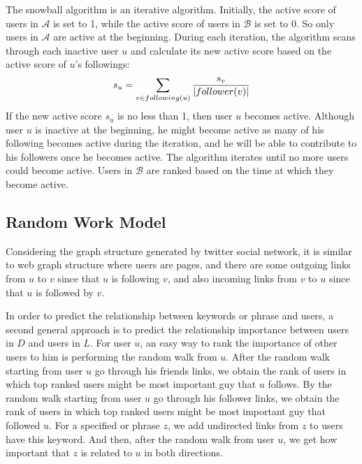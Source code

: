 \documentclass{article}
\begin{document}
The snowball algorithm is an iterative algorithm. Initially, the active score of users in $\mathcal{A}$ is set to 1, while the active score of users in $\mathcal{B}$ is set to 0. So only users in $\mathcal{A}$ are active at the beginning. During each iteration, the algorithm scans through each inactive user $u$ and calculate its new active score based on the active score of $u$'s followings:
\begin{equation}\label{eq:snowball}
s_u = \sum_{v \in following(u)} \frac{s_v}{|follower(v)|}
\end{equation}
If the new active score $s_u$ is no less than 1, then user $u$ becomes active. Although user $u$ is inactive at the beginning, he might become active as many of his following becomes active during the iteration, and he will be able to contribute to his followers once he becomes active. The algorithm iterates until no more users could become active. Users in $\mathcal{B}$ are ranked based on the time at which they become active.

\subsection{Random Work Model}
Considering the graph structure generated by twitter social network, it is similar to web graph structure where users are pages, and there are some outgoing links from $u$ to $v$ since that $u$ is following $v$, and also incoming links from $v$ to $u$ since that $u$ is followed by $v$.

In order to predict the relationship between keywords or phrase and users, a second general approach is to predict the relationship importance between users in $D$ and users in $L$. For user $u$, an easy way to rank the importance of other users to him is performing the random walk from $u$. After the random walk starting from user $u$ go through his friends links, we obtain the rank of users in which top ranked users might be most important guy that $u$ follows. By the random walk starting from user $u$ go through his follower links, we obtain the rank of users in which top ranked users might be most important guy that followed $u$. For a specified or phrase $z$, we add undirected links from $z$ to users have this keyword. And then, after the random walk from user $u$, we get how important that $z$ is related to $u$ in both directions.
\end{document}
